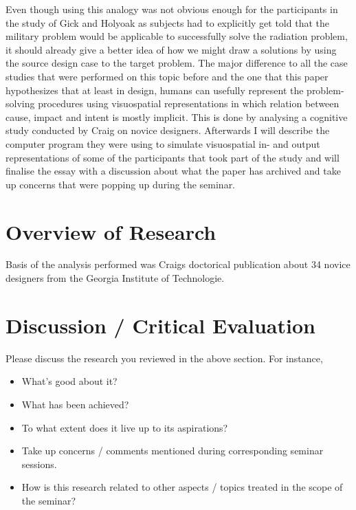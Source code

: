 \documentclass[12pt]{article}
\begin{document}
Even though using this analogy was not obvious enough for the participants in the study of Gick and Holyoak as subjects had to explicitly get told that the military problem would be applicable to successfully solve the radiation problem, it should already give a better idea of how we might draw a solutions by using the source design case to the target problem. The major difference to all the case studies that were performed on this topic before and the one that this paper hypothesizes that at least in design, humans can usefully represent the problem-solving procedures using visuospatial representations in which relation between cause, impact and intent is mostly implicit. This is done by analysing a cognitive study conducted by Craig \cite{craig2003perceptual} on novice designers. Afterwards I will describe the computer program they were using to simulate visuospatial in- and output representations of some of the participants that took part of the study and will finalise the essay with a discussion about what the paper has archived and take up concerns  that were popping up during the seminar.
\section{Overview of Research}
Basis of the analysis performed was Craigs \cite{craig2003perceptual} doctorical publication about 34 novice designers from the Georgia Institute of Technologie.


\section{Discussion / Critical Evaluation}
Please discuss the research you reviewed in the above section. For instance,
\begin{itemize}
\item What's good about it?
\item What has been achieved?
\item To what extent does it live up to its aspirations?
\item Take up concerns / comments mentioned during corresponding seminar sessions.
\item How is this research related to other aspects / topics treated in the scope of the seminar?
\end{itemize}

\noindent




\end{document}
